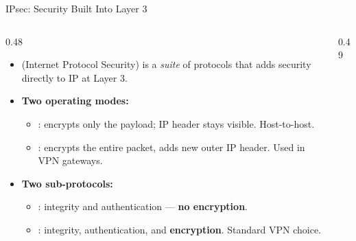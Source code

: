 \documentclass[aspectratio=169]{beamer}  %
\begin{document}

\begin{frame}[t]{IPsec: Security Built Into Layer 3}
    \begin{columns}[T]
        \begin{column}{0.48\textwidth}
            \begin{itemize}
                \item {} (Internet Protocol Security) is a \textit{suite} of protocols that adds security directly to IP at Layer 3.
                \item \textbf{Two operating modes:}
                    \begin{itemize}
                        \footnotesize
                        \item {}: encrypts only the payload; IP header stays visible. Host-to-host.
                        \item {}: encrypts the entire packet, adds new outer IP header. Used in VPN gateways.
                    \end{itemize}
                \item \textbf{Two sub-protocols:}
                    \begin{itemize}
                        \footnotesize
                        \item {}: integrity and authentication --- \textbf{no encryption}.
                        \item {}: integrity, authentication, and \textbf{encryption}. Standard VPN choice.
                    \end{itemize}
            \end{itemize}
        \end{column}
        \begin{column}{0.49\textwidth}

\end{column}
\end{columns}
\end{frame}
\end{document}

